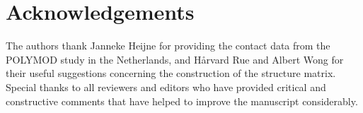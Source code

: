 \documentclass[aoas,preprint]{imsart}
\numberwithin{equation}{section}
\begin{document}
\section*{Acknowledgements}
The authors thank Janneke Heijne for providing the contact data from the POLYMOD study in the Netherlands, and H\r{a}rvard Rue and Albert Wong for their useful suggestions concerning the construction of the structure matrix. Special thanks to all reviewers and editors who have provided critical and constructive comments that have helped to improve the manuscript considerably.

\begin{supplement}
\label{SM}
\end{supplement}



\end{document}
